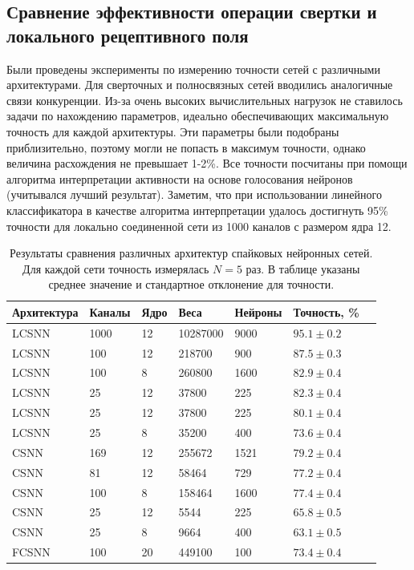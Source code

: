 \documentclass[a4paper]{article}
\begin{document}
\subsection{Сравнение эффективности операции свертки и локального рецептивного поля}
Были проведены эксперименты по измерению точности сетей с различными архитектурами. Для сверточных и полносвязных сетей вводились аналогичные связи конкуренции. Из-за очень высоких вычислительных нагрузок не ставилось задачи по нахождению параметров, идеально обеспечивающих максимальную точность для каждой архитектуры. Эти параметры были подобраны приблизительно, поэтому могли не попасть в максимум точности, однако величина расхождения не превышает 1-2\%. Все точности посчитаны при помощи алгоритма интерпретации активности на основе голосования нейронов (учитывался лучший результат). Заметим, что при использовании линейного классификатора в качестве алгоритма интерпретации удалось достигнуть 95\% точности для локально соединенной сети из 1000 каналов с размером ядра 12.

\begin{table}[H]
 \caption{Результаты сравнения различных архитектур спайковых нейронных сетей. Для каждой сети точность измерялась $N=5$ раз. В таблице указаны среднее значение и стандартное отклонение для точности.}
\begin{center}
\begin{tabular}{|l|l|l|l|l|l|l|}
\hline
Архитектура & Каналы & Ядро & Веса & Нейроны & Точность, \% \\
\hline
{LCSNN} & {1000} & {12} & {10287000} & {9000} & {$95.1 \pm 0.2$}\\
\hline
{LCSNN} & {100} & {12} & {218700} & {900} & {$87.5 \pm 0.3$}\\
\hline
{LCSNN} & {100} & {8} & {260800} & {1600} & {$82.9 \pm 0.4$}\\
\hline
{LCSNN\footnotemark} & {25} & {12} & {37800} & {225} & {$82.3 \pm 0.4$}\\
\hline
{LCSNN} & {25} & {12} & {37800} & {225} & {$80.1 \pm 0.4$}\\
\hline
{LCSNN} & {25} & {8} & {35200} & {400} & {$73.6 \pm 0.4$}\\
\hline
{CSNN} & {169} & {12} & {255672} & {1521} & {$79.2 \pm 0.4$}\\
\hline
{CSNN} & {81} & {12} & {58464} & {729} & {$77.2 \pm 0.4$}\\
\hline
{CSNN} & {100} & {8} & {158464} & {1600} & {$77.4 \pm 0.4$}\\
\hline
{CSNN} & {25} & {12} & {5544} & {225} & {$65.8 \pm 0.5$}\\
\hline
{CSNN} & {25} & {8} & {9664} & {400} & {$63.1 \pm 0.5$}\\
\hline
{FCSNN} & {100} & {20} & {449100} & {100} & {$73.4 \pm 0.4$}\\
\hline
\end{tabular}
\end{center}
\end{table}
\end{document}
